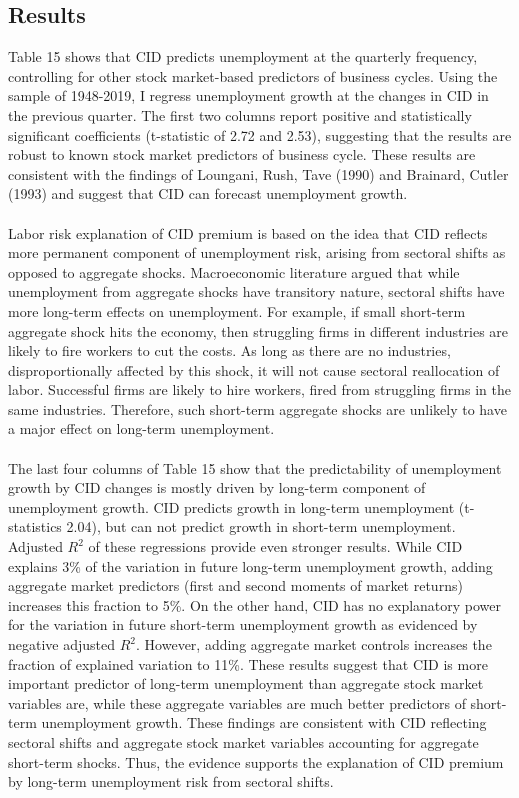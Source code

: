 \documentclass[12pt]{article}
\begin{document}
\subsection{Results}

Table 15 shows that CID predicts unemployment at the quarterly frequency, controlling for other stock market-based predictors of business cycles.
Using the sample of 1948-2019, I regress unemployment growth at the changes in CID in the previous quarter. The first two columns report positive and statistically significant coefficients (t-statistic of 2.72 and 2.53), suggesting that the results are robust to known stock market predictors of business cycle. These results are consistent with the findings of Loungani, Rush, Tave (1990) and Brainard, Cutler (1993) and suggest that CID can forecast unemployment growth. 
\paragraph{}
Labor risk explanation of CID premium is based on the idea that CID reflects more permanent component of unemployment risk, arising from sectoral shifts as opposed to aggregate shocks. Macroeconomic literature argued that while unemployment from aggregate shocks have transitory nature, sectoral shifts have more long-term effects on unemployment. For example, if small short-term aggregate shock hits the economy, then struggling firms in different industries are likely to fire workers to cut the costs. As long as there are no industries, disproportionally affected by this shock, it will not cause sectoral reallocation of labor. Successful firms are likely to hire workers, fired from struggling firms in the same industries. Therefore, such short-term aggregate shocks are unlikely to have a major effect on long-term unemployment.
\paragraph{}
The last four columns of Table 15 show that the predictability of unemployment growth by CID changes is mostly driven by long-term component of unemployment growth. CID predicts growth in long-term unemployment (t-statistics 2.04), but can not predict growth in short-term unemployment. Adjusted $R^2$ of these regressions provide even stronger results. While CID explains 3\% of the variation in future long-term unemployment growth, adding aggregate market predictors (first and second moments of market returns) increases this fraction to 5\%. On the other hand, CID has no explanatory power for the variation in future short-term unemployment growth  as evidenced by negative adjusted $R^2$. However, adding aggregate market controls increases the fraction of explained variation to 11\%. These results suggest that CID is more important predictor of long-term unemployment than aggregate stock market variables are, while these aggregate variables are much better predictors of short-term unemployment growth. These findings are consistent with CID reflecting sectoral shifts and aggregate stock market variables accounting for aggregate short-term shocks. Thus, the evidence supports the explanation of CID premium by long-term unemployment risk from sectoral shifts.
\end{document}
